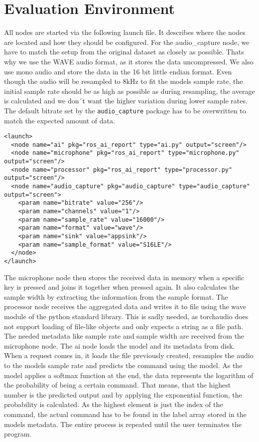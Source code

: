 \section{Evaluation Environment}
All nodes are started via the following launch file. It describes where the nodes are located and how they should be configured. For the audio_capture node, we have to
match the setup from the original dataset as closely as possible. Thats why we use the WAVE audio format, as it stores the data uncompressed. We also use mono audio
and store the data in the 16 bit little endian format. Even though the audio will be resampled to 8kHz to fit the models sample rate, the initial sample rate should
be as high as possible as during resampling, the average is calculated and we don´t want the higher variation during lower sample rates. The default bitrate set by
the \texttt{audio_capture} package has to be overwritten to match the expected amount of data.

\lstset{language=XML}
\begin{lstlisting}
<launch>
  <node name="ai" pkg="ros_ai_report" type="ai.py" output="screen"/>
  <node name="microphone" pkg="ros_ai_report" type="microphone.py" output="screen"/>
  <node name="processor" pkg="ros_ai_report" type="processor.py" output="screen"/>
  <node name="audio_capture" pkg="audio_capture" type="audio_capture" output="screen">
    <param name="bitrate" value="256"/>
    <param name="channels" value="1"/>
    <param name="sample_rate" value="16000"/>
    <param name="format" value="wave"/>
    <param name="sink" value="appsink"/>
    <param name="sample_format" value="S16LE"/>
  </node>
</launch>
\end{lstlisting}

The microphone node then stores the received data in memory when a specific key is pressed and joins it together when pressed again. It also calculates the
sample width by extracting the information from the sample format. The processor node receives the aggregated data and writes it to file using the wave module
of the python standard library. This is sadly needed, as torchaudio does not support loading of file-like objects and only expects a string as a file path. The 
needed metadata like sample rate and sample width are received from the microphone node. The ai node loads the model and its metadata from disk. When a request
comes in, it loads the file previously created, resamples the audio to the models sample rate and predicts the command using the model. As the model applies a softmax
function at the end, the data represents the logarithm of the probability of being a certain command. That means, that the highest number is the predicted output
and by applying the exponential function, the probability is calculated. As the highest element is just the index of the command, the actual command has to
be found in the label array stored in the models metadata. The entire process is repeated until the user terminates the program.
